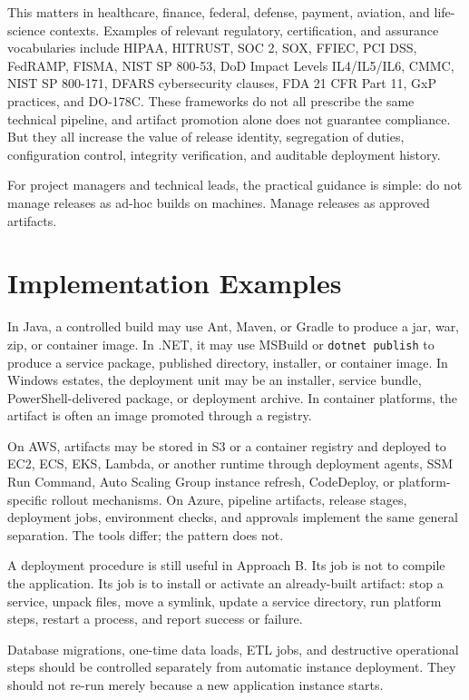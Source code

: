 \documentclass[11pt]{article}
\begin{document}
This matters in healthcare, finance, federal, defense, payment, aviation, and life-science contexts. Examples of relevant regulatory, certification, and assurance vocabularies include HIPAA, HITRUST, SOC 2, SOX, FFIEC, PCI DSS, FedRAMP, FISMA, NIST SP 800-53, DoD Impact Levels IL4/IL5/IL6, CMMC, NIST SP 800-171, DFARS cybersecurity clauses, FDA 21 CFR Part 11, GxP practices, and DO-178C. These frameworks do not all prescribe the same technical pipeline, and artifact promotion alone does not guarantee compliance. But they all increase the value of release identity, segregation of duties, configuration control, integrity verification, and auditable deployment history.

For project managers and technical leads, the practical guidance is simple: do not manage releases as ad-hoc builds on machines. Manage releases as approved artifacts.

\section{Implementation Examples}

In Java, a controlled build may use Ant, Maven, or Gradle to produce a jar, war, zip, or container image. In .NET, it may use MSBuild or \texttt{dotnet publish} to produce a service package, published directory, installer, or container image. In Windows estates, the deployment unit may be an installer, service bundle, PowerShell-delivered package, or deployment archive. In container platforms, the artifact is often an image promoted through a registry.

On AWS, artifacts may be stored in S3 or a container registry and deployed to EC2, ECS, EKS, Lambda, or another runtime through deployment agents, SSM Run Command, Auto Scaling Group instance refresh, CodeDeploy, or platform-specific rollout mechanisms. On Azure, pipeline artifacts, release stages, deployment jobs, environment checks, and approvals implement the same general separation. The tools differ; the pattern does not.

A deployment procedure is still useful in Approach B. Its job is not to compile the application. Its job is to install or activate an already-built artifact: stop a service, unpack files, move a symlink, update a service directory, run platform steps, restart a process, and report success or failure.

Database migrations, one-time data loads, ETL jobs, and destructive operational steps should be controlled separately from automatic instance deployment. They should not re-run merely because a new application instance starts.
\end{document}
